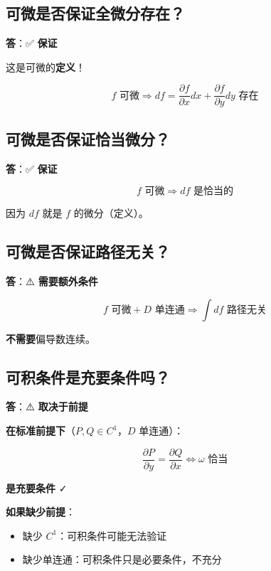 \documentclass[12pt,a4paper]{article}
\begin{document}
\subsection{可微是否保证全微分存在？}

\textbf{答}：✅ \textbf{保证}

这是可微的\textbf{定义}！

\begin{equation}
\boxed{f \text{ 可微} \Rightarrow df = \frac{\partial f}{\partial x}dx + \frac{\partial f}{\partial y}dy \text{ 存在}}
\end{equation}

\subsection{可微是否保证恰当微分？}

\textbf{答}：✅ \textbf{保证}

\begin{equation}
\boxed{f \text{ 可微} \Rightarrow df \text{ 是恰当的}}
\end{equation}

因为 $df$ 就是 $f$ 的微分（定义）。

\subsection{可微是否保证路径无关？}

\textbf{答}：⚠️ \textbf{需要额外条件}

\begin{equation}
\boxed{f \text{ 可微} + D \text{ 单连通} \Rightarrow \int df \text{ 路径无关}}
\end{equation}

\textbf{不需要}偏导数连续。

\subsection{可积条件是充要条件吗？}

\textbf{答}：⚠️ \textbf{取决于前提}

\textbf{在标准前提下}（$P, Q \in C^1$，$D$ 单连通）：

\begin{equation}
\boxed{\frac{\partial P}{\partial y} = \frac{\partial Q}{\partial x} \Leftrightarrow \omega \text{ 恰当}}
\end{equation}

\textbf{是充要条件} ✓

\textbf{如果缺少前提}：
\begin{itemize}
\item 缺少 $C^1$：可积条件可能无法验证
\item 缺少单连通：可积条件只是必要条件，不充分
\end{itemize}
\end{document}
